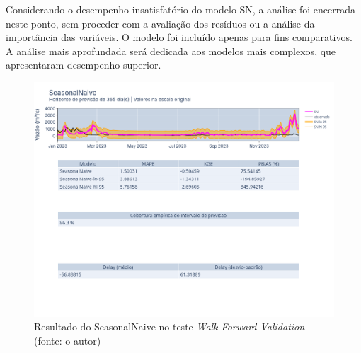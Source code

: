 
Considerando o desempenho insatisfatório do modelo SN, a análise foi encerrada neste ponto, sem proceder com a avaliação dos resíduos ou a análise da importância das variáveis. O modelo foi incluído apenas para fins comparativos. A análise mais aprofundada será dedicada aos modelos mais complexos, que apresentaram desempenho superior.

\begin{figure}[!h]
	\centering
	\includegraphics[scale=0.33]{Figuras/jequiti/resultados/SN_WFV.png}
	\caption{Resultado do SeasonalNaive no teste \textit{Walk-Forward Validation}\\(fonte: o autor)}
	\label{fig:jequiti_SN_WFV}
\end{figure}


